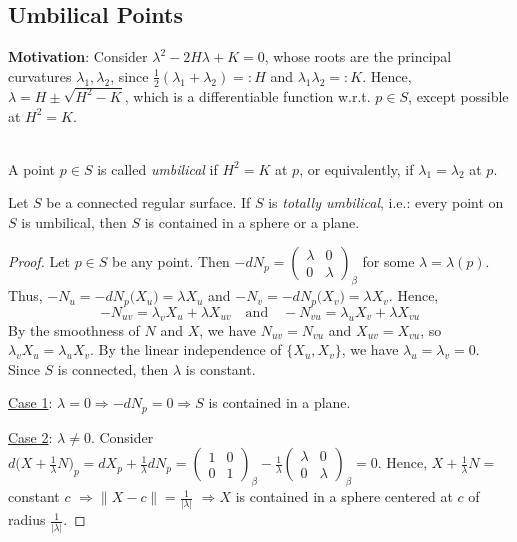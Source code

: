 \subsection{Umbilical Points}

\noindent\textbf{Motivation}: Consider $\lambda^2 - 2H\lambda + K = 0$, whose roots are the principal curvatures $\lambda_1, \lambda_2$, since $\frac{1}{2}(\lambda_1 + \lambda_2) =: H$ and $\lambda_1\lambda_2 =: K$. Hence, $\lambda = H\pm\sqrt{H^2 - K}$, which is a differentiable function w.r.t. $p\in S$, except possible at $H^2 = K$.

\\
A point $p\in S$ is called \textit{umbilical} if $H^2 = K$ at $p$, or equivalently, if $\lambda_1 = \lambda_2$ at $p$.

\begin{theorem}
Let $S$ be a connected regular surface. If $S$ is \textit{totally umbilical}, i.e.: every point on $S$ is umbilical, then $S$ is contained in a sphere or a plane.
\end{theorem}

\begin{proof}
Let $p\in S$ be any point. Then $-dN_p = \begin{pmatrix}\lambda & 0\\ 0 & \lambda\end{pmatrix}_\beta$ for some $\lambda = \lambda(p)$. Thus, $-N_u = -dN_p\big(X_u\big) = \lambda X_u$ and $-N_v = -dN_p\big(X_v\big) = \lambda X_v$. Hence,
\[
-N_{uv} = \lambda_v X_u + \lambda X_{uv} \quad\text{and}\quad -N_{vu} = \lambda_u X_v + \lambda X_{vu}
\]
By the smoothness of $N$ and $X$, we have $N_{uv} = N_{vu}$ and $X_{uv} = X_{vu}$, so $\lambda_v X_u = \lambda_u X_v$. By the linear independence of $\{X_u, X_v\}$, we have $\lambda_u = \lambda_v = 0$. Since $S$ is connected, then $\lambda$ is constant.

\noindent\underline{Case 1}: $\lambda = 0 \Rightarrow -dN_p = 0 \Rightarrow S$ is contained in a plane.

\noindent\underline{Case 2}: $\lambda\neq 0$. Consider $d\Big(X + \frac{1}{\lambda}N\Big)_p = dX_p + \frac{1}{\lambda}dN_p = \begin{pmatrix}1 & 0\\ 0 & 1\end{pmatrix}_\beta - \frac{1}{\lambda}\begin{pmatrix}\lambda & 0\\ 0 & \lambda\end{pmatrix}_\beta = 0$. Hence, $X + \frac{1}{\lambda}N = $ constant $c$ $\Rightarrow \big\|X - c\big\| = \frac{1}{|\lambda|}$ $\Rightarrow X$ is contained in a sphere centered at $c$ of radius $\frac{1}{|\lambda|}$.
\end{proof}


